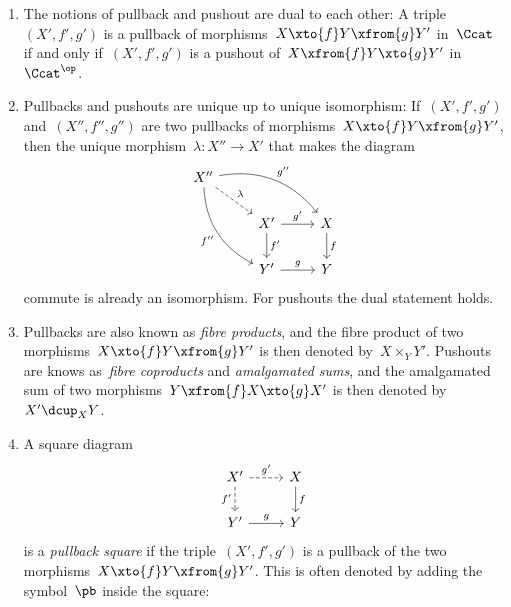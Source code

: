 \begin{remark*}
  \leavevmode
  \begin{enumerate}
    \item
      The notions of pullback and pushout are dual to each other:
      A triple~$(X', f', g')$ is a pullback of morphisms~$X \xto{f} Y \xfrom{g} Y'$ in~$\Ccat$ if and only if~$(X', f', g')$ is a pushout of~$X \xfrom{f} Y \xto{g} Y'$ in~$\Ccat^\op$.
    \item
      Pullbacks and pushouts are unique up to unique isomorphism:
      If~$(X', f', g')$ and~$(X'', f'', g'')$ are two pullbacks of morphisms~$X \xto{f} Y \xfrom{g} Y'$, then the unique morphism~$\lambda \colon X'' \to X'$ that makes the diagram
      \[
        \begin{tikzcd}
            X''
            \arrow[bend left]{drr}[above right]{g''}
            \arrow[dashed]{dr}[above right]{\lambda}
            \arrow[bend right]{ddr}[below left]{f''}
          & {}
          & {}
          \\
            {}
          & X'
            \arrow{r}[above]{g'}
            \arrow{d}[right]{f'}
          & X
            \arrow{d}[right]{f}
          \\
            {}
          & Y'
            \arrow{r}[above]{g}
          & Y
        \end{tikzcd}
      \]
      commute is already an isomorphism.
      For pushouts the dual statement holds.
    \item
      Pullbacks are also known as \emph{fibre products}, and the fibre product of two morphisms~$X \xto{f} Y \xfrom{g} Y'$ is then denoted by~$X \times_Y Y'$.
      Pushouts are knows as~\emph{fibre coproducts} and \emph{amalgamated sums}, and the amalgamated sum of two morphisms~$Y \xfrom{f} X \xto{g} X'$ is then denoted by~$X' \dcup_X Y$.
    \item
      A square diagram
      \[
        \begin{tikzcd}
            X'
            \arrow[dashed]{r}[above]{g'}
            \arrow[dashed]{d}[left]{f'}
          & X
            \arrow{d}[right]{f}
          \\
            Y'
            \arrow{r}[above]{g}
          & Y
        \end{tikzcd}
      \]
      is a \emph{pullback square} if the triple~$(X',f',g')$ is a pullback of the two morphisms~$X \xto{f} Y \xfrom{g} Y'$.
      This is often denoted by adding the symbol~$\pb$ inside the square:

\end{enumerate}
\end{remark*}
